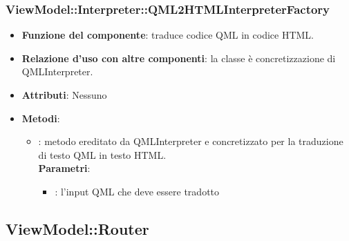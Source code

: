\subsubsection{ViewModel::Interpreter::QML2HTMLInterpreterFactory}
\begin{itemize}
\item\textbf{Funzione del componente}: traduce codice QML in codice HTML.
	\item\textbf{Relazione d'uso con altre componenti}: la classe è concretizzazione di QMLInterpreter.\\
\item\textbf{Attributi}: Nessuno
\item\textbf{Metodi}:
	\begin{itemize}
		\item{}: metodo ereditato da QMLInterpreter e concretizzato per la traduzione di testo QML in testo HTML.\\
		\textbf{Parametri}:
			\begin{itemize}
				\item{}: l'input QML che deve essere tradotto \\
			\end{itemize}
	\end{itemize}
\end{itemize}

\subsection{ViewModel::Router}

